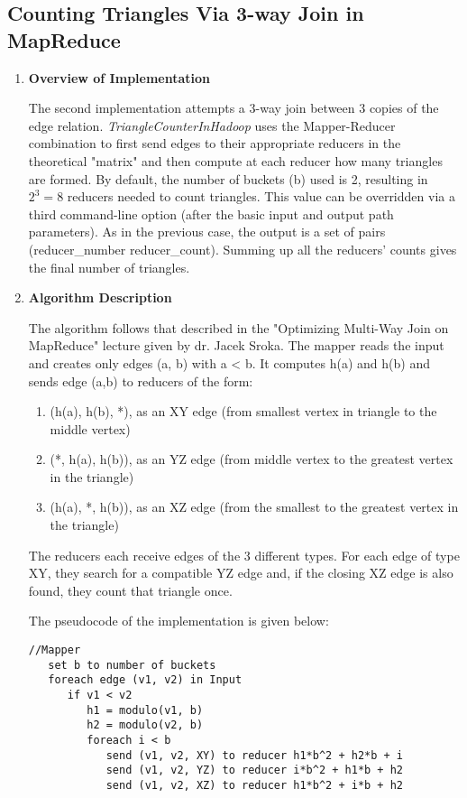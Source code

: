\documentclass[Graph.tex]{subfiles}
\begin{document}
\newpage

\subsection{Counting Triangles Via 3-way Join in MapReduce}

\begin{enumerate}[a]

\item{
\textbf{Overview of Implementation}

The second implementation attempts a 3-way join between 3 copies of the edge relation. \textit{TriangleCounterInHadoop} uses the Mapper-Reducer combination to first send edges to their appropriate reducers in the theoretical "matrix" and then compute at each reducer how many triangles are formed. By default, the number of buckets (b) used is 2, resulting in $2^3=8$ reducers needed to count triangles. This value can be overridden via a third command-line option (after the basic input and output path parameters). As in the previous case, the output is a set of pairs (reducer\_number reducer\_count). Summing up all the reducers' counts gives the final number of triangles.
}

\item{
\textbf{Algorithm Description}

The algorithm follows that described in the "Optimizing Multi-Way Join on MapReduce" lecture given by dr. Jacek Sroka. The mapper reads the input and creates only edges (a, b) with a < b. It computes h(a) and h(b) and sends edge (a,b) to reducers of the form:
\begin{enumerate}
\item {(h(a), h(b), *), as an XY edge (from smallest vertex in triangle to the middle vertex)}
\item {(*, h(a), h(b)), as an YZ edge (from middle vertex to the greatest vertex in the triangle)}
\item {(h(a), *, h(b)), as an XZ edge (from the smallest to the greatest vertex in the triangle)}
\end{enumerate}

The reducers each receive edges of the 3 different types. For each edge of type XY, they search for a compatible YZ edge and, if the closing XZ edge is also found, they count that triangle once.

The pseudocode of the implementation is given below:

\begin{lstlisting}
//Mapper
   set b to number of buckets
   foreach edge (v1, v2) in Input
      if v1 < v2
         h1 = modulo(v1, b)
         h2 = modulo(v2, b)
         foreach i < b
            send (v1, v2, XY) to reducer h1*b^2 + h2*b + i
            send (v1, v2, YZ) to reducer i*b^2 + h1*b + h2
            send (v1, v2, XZ) to reducer h1*b^2 + i*b + h2
            

\end{lstlisting}}
\end{enumerate}
\end{document}
